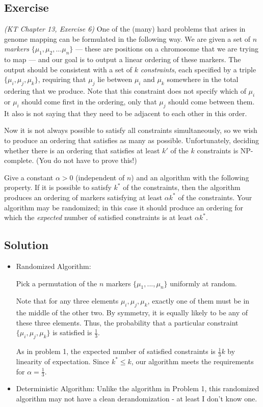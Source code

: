 \documentclass{article}
\newcounter{counter}
\newcommand{\Exercise}{Exercise \stepcounter{counter}\thecounter}
\begin{document}
\subsection*{\Exercise}
    \textit{(KT Chapter 13, Exercise 6)} One of the (many) hard problems that arises in genome mapping can be formulated in the following way.  We are given a set of $n$ {\it markers} $\{\mu_1, \mu_2, \dots \mu_n\}$ --- these are positions on a chromosome that we are trying to map --- and our goal is to output a linear ordering of these markers.  The output should be consistent with a set of $k$ {\it constraints}, each specified by a triple $\{\mu_i, \mu_j, \mu_k\}$, requiring that $\mu_j$ lie between $\mu_i$ and $\mu_k$ somewhere in the total ordering that we produce. Note that this constraint does not specify which of $\mu_i$ or $\mu_i$ should come first in the ordering, only that $\mu_j$ should come between them. It also is not saying that they need to be adjacent to each other in this order.
    
    \vspace{3mm}
    Now it is not always possible to satisfy all constraints simultaneously, so we wish to produce an ordering that satisfies as many as possible. Unfortunately, deciding whether there is an ordering that satisfies at least $k'$ of the $k$ constraints is NP-complete.  (You do not have to prove this!)
    
    \vspace{3mm}
    Give a constant $\alpha > 0$ (independent of $n$) and an algorithm with the following property.  If it is possible to satisfy $k^*$ of the constraints, then the algorithm produces an ordering of markers satisfying at least $\alpha k^*$ of the constraints.  Your algorithm may be randomized; in this case it should produce an ordering for which the {\it expected} number of satisfied constraints is at least $\alpha k^*$.

\subsection*{Solution}
  \begin{itemize}
    \item Randomized Algorithm: 
    
    Pick a permutation of the $n$ markers $\{\mu_1,..., \mu_n\}$ uniformly at random. 
      
      Note that for any three elements $\mu_i, \mu_j, \mu_k$, exactly one of
      them must be in the middle of the other two. By symmetry, it is equally
      likely to be any of these three elements. Thus, the probability that a
      particular constraint $\{\mu_i,\mu_j,\mu_k\}$ is satisfied is $\frac{1}{3}$.

      As in problem 1, the expected number of satisfied constraints is
      $\frac13 k$ by linearity of expectation. Since $k^* \leq k$, our
      algorithm meets the requirements for $\alpha = \frac13$.

    \item Deterministic Algorithm: Unlike the algorithm in Problem 1, this
      randomized algorithm may not have a clean derandomization - at least I
      don't know one.
  \end{itemize}
\end{document}
